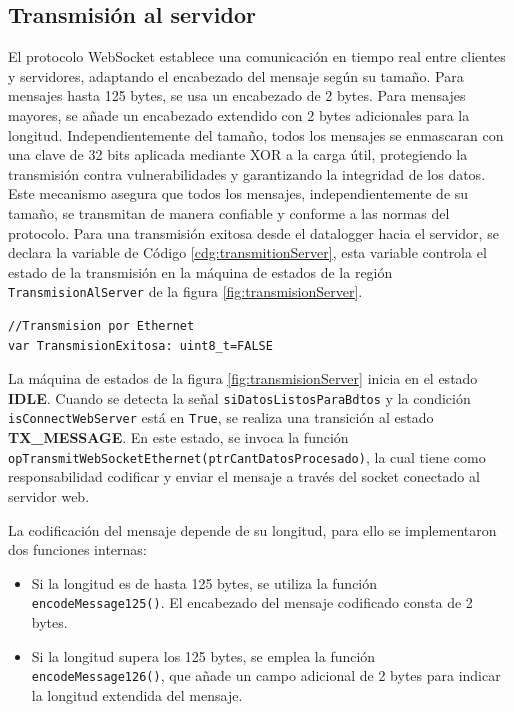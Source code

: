 \subsection{Transmisión al servidor}

El protocolo WebSocket establece una comunicación en tiempo real entre clientes y servidores, adaptando el encabezado del mensaje según su tamaño. Para mensajes hasta 125 bytes, se usa un encabezado de 2 bytes. Para mensajes mayores, se añade un encabezado extendido con 2 bytes adicionales para la longitud. Independientemente del tamaño, todos los mensajes se enmascaran con una clave de 32 bits aplicada mediante XOR a la carga útil, protegiendo la transmisión contra vulnerabilidades y garantizando la integridad de los datos. Este mecanismo asegura que todos los mensajes, independientemente de su tamaño, se transmitan de manera confiable y conforme a las normas del protocolo. Para una transmisión exitosa desde el datalogger hacia el servidor, se declara la variable de Código \ref{cdg:transmitionServer}, esta variable controla el estado de la transmisión en la máquina de estados de la región \texttt{TransmisionAlServer} de la figura \ref{fig:transmisionServer}.

\begin{lstlisting}[style=yakindustyle, caption={Declaración de variable para controlar el estado de una transmisión al servidor.}, label=cdg:transmitionServer,basicstyle=\ttfamily\fontsize{8}{8}\selectfont]
//Transmision por Ethernet
var TransmisionExitosa: uint8_t=FALSE
\end{lstlisting}

La máquina de estados de la figura \ref{fig:transmisionServer} inicia en el estado \textbf{IDLE}. Cuando se detecta la señal \texttt{siDatosListosParaBdtos} y la condición \texttt{isConnectWebServer} está en \texttt{True}, se realiza una transición al estado \textbf{TX\_MESSAGE}. En este estado, se invoca la función\\ \texttt{opTransmitWebSocketEthernet(ptrCantDatosProcesado)}, la cual tiene como responsabilidad codificar y enviar el mensaje a través del socket conectado al servidor web.

La codificación del mensaje depende de su longitud, para ello se implementaron dos funciones internas:
\begin{itemize}
  \item Si la longitud es de hasta 125 bytes, se utiliza la función \texttt{encodeMessage125()}. El encabezado del mensaje codificado consta de 2 bytes.
  \item Si la longitud supera los 125 bytes, se emplea la función \texttt{encodeMessage126()}, que añade un campo adicional de 2 bytes para indicar la longitud extendida del mensaje.
\end{itemize}

